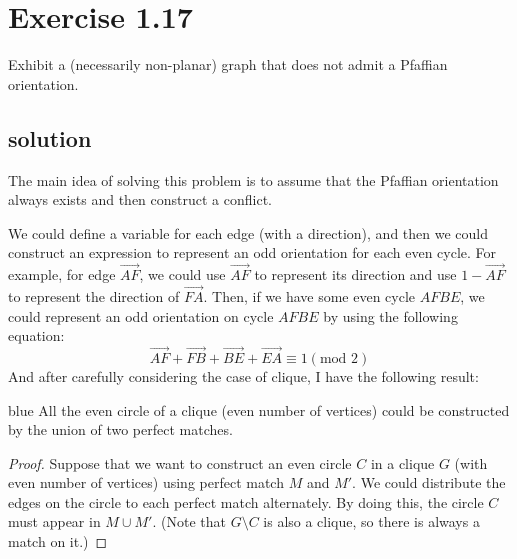 \documentclass{article}
\begin{document}
\section{Exercise 1.17}
Exhibit a (necessarily non-planar) graph that does not admit a Pfaffian orientation.
\subsection{solution}
The main idea of solving this problem is to assume that the Pfaffian orientation always exists and then construct a conflict.

We could define a variable for each edge (with a direction), and then we could construct an expression to represent an odd orientation for each even cycle.
For example, for edge $\overrightarrow{AF}$, we could use $\overrightarrow{AF}$ to represent its direction and use $1- \overrightarrow{AF}$ to represent the direction of $\overrightarrow{FA}$.
 Then, if we have some even cycle $AFBE$, we could represent an odd orientation on cycle $AFBE$ by using the following equation:
     \[
         \overrightarrow{AF} + \overrightarrow{FB} + \overrightarrow{BE} + \overrightarrow{EA} \equiv 1 (\mbox{mod } 2)
     \]
And after carefully considering the case of clique, I have the following result:


\begin{mybox}{blue}{
All the even circle of a clique (even number of vertices) could be constructed by the union of two perfect matches.
}
\begin{proof}
    Suppose that we want to construct an even circle $C$ in a clique $G$ (with even number of vertices) using perfect match $M$ and $M'$. We could distribute the edges on the circle to each perfect match alternately. By doing this, the circle $C$ must appear in $M\cup M'$. (Note that $G\setminus C$ is also a clique, so there is always a match on it.)
\end{proof}
\end{mybox}
\end{document}
